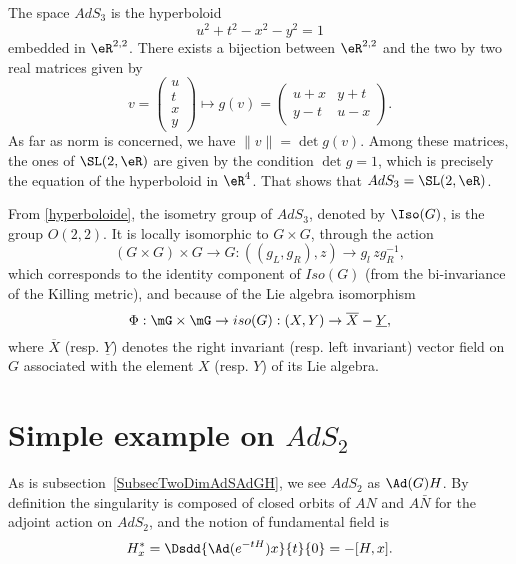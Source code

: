 The space $AdS_3$ is the hyperboloid
\begin{equation} \label{hyperboloide}
 u^2 + t^2 - x^2 - y^2 = 1
 \end{equation}
embedded in $\eR^{2,2}$. There exists a bijection between $\eR^{2,2}$ and the two by two real matrices given by
\[
 v= \begin{pmatrix}
u\\t\\x\\y
\end{pmatrix}
\mapsto
g(v)=\begin{pmatrix}
u+x&y+t\\
y-t&u-x
\end{pmatrix}.
\]
As far as norm is concerned, we have $\| v \|=\det g(v)$. Among these matrices, the ones of $\SL(2,\eR)$ are given by the condition $\det g=1$, which is precisely the equation of the hyperboloid in $\eR^{4}$. That shows that $AdS_3=\SL(2,\eR)$.

From \eqref{hyperboloide}, the isometry group of $AdS_3$, denoted by $\Iso(G)$, is the group $O(2,2)$. It is locally isomorphic to $G \times G$, through the action
\begin{equation}
 (G \times G) \times G \longrightarrow G \colon((g_L,g_R),z)
 \rightarrow g_l \, z g_R^{-1},
 \end{equation}
 which corresponds to the identity component of $Iso(G)$ (from the bi-invariance of the Killing metric), and because of the Lie algebra isomorphism
\begin{equation}\label{Iso}
 \Phi: \mG \times \mG \rightarrow iso(G) : (X,Y)
 \rightarrow  \overline{X} - \underline{Y},
\end{equation}
where $\overline{X}$ (resp. $\underline{Y}$) denotes the right invariant (resp. left invariant) vector field on $G$ associated with the element $X$ (resp. $Y$) of its Lie algebra.

\section{Simple example on \texorpdfstring{$AdS_{2}$}{AdS2}}\label{sec_AdSdeux}

As is subsection~\ref{SubsecTwoDimAdSAdGH}, we see $AdS_2$ as $\Ad(G)H$. By definition the singularity is composed of closed orbits of $AN$ and $A\bar{N}$ for the adjoint action on $AdS_2$, and the notion of fundamental field is
\begin{equation}
H^*_x=\Dsdd{\Ad(e^{-tH})x}{t}{0} =-[H,x].
\end{equation}


